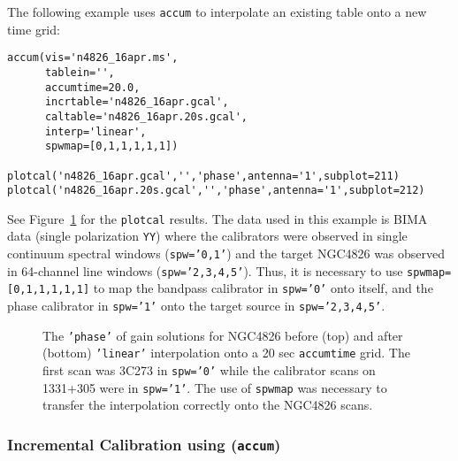The following example uses {\tt accum} to interpolate an existing
table onto a new time grid:
\small
\begin{verbatim}
accum(vis='n4826_16apr.ms',
      tablein='',
      accumtime=20.0,
      incrtable='n4826_16apr.gcal',
      caltable='n4826_16apr.20s.gcal',
      interp='linear',
      spwmap=[0,1,1,1,1,1])

plotcal('n4826_16apr.gcal','','phase',antenna='1',subplot=211)
plotcal('n4826_16apr.20s.gcal','','phase',antenna='1',subplot=212)
\end{verbatim}
\normalsize
See Figure~\ref{fig:accum_interp} for the {\tt plotcal} results.
The data used in this example is BIMA data (single polarization 
{\tt  YY}) where the calibrators were observed in single continuum
spectral windows ({\tt spw='0,1'}) and the target NGC4826 was observed
in 64-channel line windows ({\tt spw='2,3,4,5'}).  Thus, it is 
necessary to use {\tt spwmap=[0,1,1,1,1,1]} to map the bandpass
calibrator in {\tt spw='0'} onto itself, and the phase calibrator 
in {\tt spw='1'} onto the target source in {\tt spw='2,3,4,5'}.

\begin{figure}[h!]
\begin{center}
\caption{\label{fig:accum_interp} The {\tt 'phase'} of gain solutions
for NGC4826 before (top) and after (bottom) {\tt 'linear'} interpolation onto
a 20 sec {\tt accumtime} grid.  The first scan was 3C273 in {\tt spw='0'} 
while the calibrator scans on 1331+305 were in {\tt spw='1'}.  The use of 
{\tt spwmap} was necessary to transfer the interpolation correctly
onto the NGC4826 scans.
}
\hrulefill
\end{center}
\end{figure}



\subsubsection{Incremental Calibration using ({\tt accum})}
\label{section:cal.tables.accum.incr}

